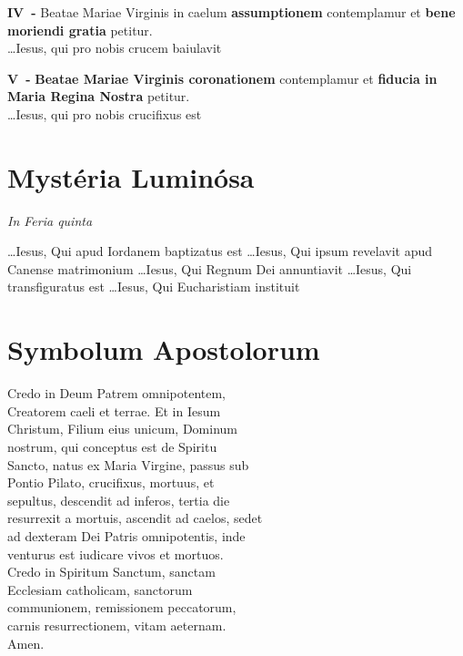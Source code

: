 \documentclass[paper=a5,pagesize=pdftex,fontsize=10pt,headinclude=on,twoside=off]{scrbook}
\newcommand{\mysterium}[1]{\textbf{#1}}
\newcommand{\mysteriumnumero}[1]{\textbf{#1~-}}
\newcommand{\fructum}[1]{\textbf{#1}}
\newcommand{\dies}[1]{\vspace{-0.6cm}\begin{center}\textit{\tiny#1}\end{center}\vspace{-0.1cm}}
\begin{document}
\mysteriumnumero{IV} Beatae Mariae Virginis in caelum \mysterium{assumptionem} contemplamur et \fructum{bene moriendi gratia} petitur.\\
\hspace*{0pt}\hfill \ldots Iesus, qui pro nobis crucem baiulavit

\mysteriumnumero{V} \mysterium{Beatae Mariae Virginis coronationem} contemplamur et \fructum{fiducia in Maria Regina Nostra} petitur.\\
\hspace*{0pt}\hfill \ldots Iesus, qui pro nobis crucifixus est

\section{Mystéria Luminósa}
\dies{In Feria quinta}

\hspace*{0pt}\hfill \ldots Iesus, Qui apud Iordanem baptizatus est
\hspace*{0pt}\hfill \ldots Iesus, Qui ipsum revelavit apud Canense matrimonium
\hspace*{0pt}\hfill \ldots Iesus, Qui Regnum Dei annuntiavit
\hspace*{0pt}\hfill \ldots Iesus, Qui transfiguratus est 
\hspace*{0pt}\hfill \ldots Iesus, Qui Eucharistiam instituit

\newpage
\section{Symbolum Apostolorum}
\begin{scripture}
  \begin{poetry}
    Credo in Deum Patrem omnipotentem,\\
    Creatorem caeli et terrae. Et in Iesum\\
    Christum, Filium eius unicum, Dominum\\
    nostrum, qui conceptus est de Spiritu\\
    Sancto, natus ex Maria Virgine, passus sub\\
    Pontio Pilato, crucifixus, mortuus, et\\
    sepultus, descendit ad inferos, tertia die\\
    resurrexit a mortuis, ascendit ad caelos, sedet\\
    ad dexteram Dei Patris omnipotentis, inde\\
    venturus est iudicare vivos et mortuos.\\
    Credo in Spiritum Sanctum, sanctam\\
    Ecclesiam catholicam, sanctorum\\
    communionem, remissionem peccatorum,\\
    carnis resurrectionem, vitam aeternam.\\
    Amen.\\
  \end{poetry}
\end{scripture}
\end{document}
